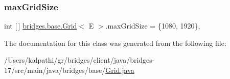 \mbox{\label{classbridges_1_1base_1_1_grid_a803fd4c070a22863c82581f0bb258c1c}} 
\subsubsection{\texorpdfstring{max\+Grid\+Size}{maxGridSize}}
{\footnotesize\ttfamily int \mbox{[}$\,$\mbox{]} \mbox{\hyperlink{classbridges_1_1base_1_1_grid}{bridges.\+base.\+Grid}}$<$ E $>$.max\+Grid\+Size = \{1080, 1920\}\hspace{0.3cm}{\ttfamily [static]}, {\ttfamily [protected]}}



The documentation for this class was generated from the following file\+:\begin{DoxyCompactItemize}
\item 
/\+Users/kalpathi/gr/bridges/client/java/bridges-\/17/src/main/java/bridges/base/\mbox{\hyperlink{_grid_8java}{Grid.\+java}}\end{DoxyCompactItemize}
